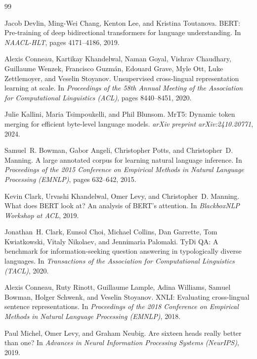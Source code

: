 \documentclass[11pt,a4paper]{article}
\begin{document}

\begin{thebibliography}{99}

Jacob Devlin, Ming-Wei Chang, Kenton Lee, and Kristina Toutanova.
{BERT}: Pre-training of deep bidirectional transformers for language understanding.
In \emph{NAACL-HLT}, pages 4171--4186, 2019.

Alexis Conneau, Kartikay Khandelwal, Naman Goyal, Vishrav Chaudhary, Guillaume Wenzek, Francisco Guzm\'{a}n, Edouard Grave, Myle Ott, Luke Zettlemoyer, and Veselin Stoyanov.
Unsupervised cross-lingual representation learning at scale.
In \emph{Proceedings of the 58th Annual Meeting of the Association for Computational Linguistics (ACL)}, pages 8440--8451, 2020.

Julie Kallini, Maria Tsimpoukelli, and Phil Blunsom.
{MrT5}: Dynamic token merging for efficient byte-level language models.
\emph{arXiv preprint arXiv:2410.20771}, 2024.

Samuel~R. Bowman, Gabor Angeli, Christopher Potts, and Christopher~D. Manning.
A large annotated corpus for learning natural language inference.
In \emph{Proceedings of the 2015 Conference on Empirical Methods in Natural Language Processing (EMNLP)}, pages 632--642, 2015.

Kevin Clark, Urvashi Khandelwal, Omer Levy, and Christopher~D. Manning.
What does {BERT} look at? {A}n analysis of {BERT}'s attention.
In \emph{BlackboxNLP Workshop at ACL}, 2019.

Jonathan~H. Clark, Eunsol Choi, Michael Collins, Dan Garrette, Tom Kwiatkowski, Vitaly Nikolaev, and Jennimaria Palomaki.
{TyDi QA}: A benchmark for information-seeking question answering in typologically diverse languages.
In \emph{Transactions of the Association for Computational Linguistics (TACL)}, 2020.

Alexis Conneau, Ruty Rinott, Guillaume Lample, Adina Williams, Samuel Bowman, Holger Schwenk, and Veselin Stoyanov.
{XNLI}: Evaluating cross-lingual sentence representations.
In \emph{Proceedings of the 2018 Conference on Empirical Methods in Natural Language Processing (EMNLP)}, 2018.

Paul Michel, Omer Levy, and Graham Neubig.
Are sixteen heads really better than one?
In \emph{Advances in Neural Information Processing Systems (NeurIPS)}, 2019.


\end{thebibliography}
\end{document}
